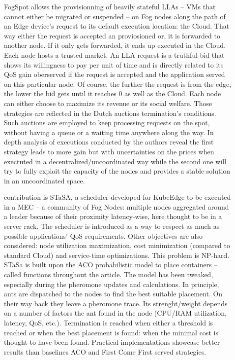 \documentclass[11pt]{sdm}
\begin{document}
\begin{description}
	\item[] FogSpot allows the provisionning of heavily stateful \glspl{LLA} -- \glspl{VM} that cannot either be migrated or suspended -- on Fog nodes along the path of an Edge device's request to its default execution location: the Cloud. That way either the request is accepted an proviosioned or, it is forwarded to another node. If it only gets forwarded, it ends up executed in the Cloud. 
	Each node hosts a trusted market. An \gls{LLA} request is a truthful bid that shows its willingness to pay per unit of time and is directly related to its \gls{QoS} gain oberserved if the request is accepted and the application served on this particular node. Of course, the further the request is from the edge, the lower the bid gets until it reaches 0 as well as the Cloud.
	Each node can either choose to maximize its revenue or its social welfare. Those strategies are reflected in the Dutch auctions termination's conditions. Such auctions are employed to keep processing requests on the spot, without having a queue or a waiting time anywhere along the way. In depth analysis of executions conducted by the authors reveal the first strategy leads to more gain but with uncertainties on the prices when exectuted in a decentralized/uncoordinated way while the second one will try to fully exploit the capacity of the nodes and provides a stable solution in an uncoordinated space.
	
	\item[] contribution is STaSA, a scheduler developed for KubeEdge to be executed in a \gls{MEC} -- a community of Fog Nodes: multiple nodes aggregated around a leader because of their proximity latency-wise, here thought to be in a server rack. The scheduler is introduced as a way to respect as much as possible applications' \gls{QoS} requirements. Other objectives are also considered: node utilization maximization, cost minimization (compared to standard Cloud) and service-time optimizations. This problem is NP-hard. STaSa is built upon the \gls{ACO} probabilistic model to place containers -- called functions throughout the article. The model has been tweaked, especially during the pheromone updates and calculations. In principle, ants are dispatched to the nodes to find the best suitable placement. On their way back they leave a pheromone trace. Its strenght/weight depends on a number of factors the ant found in the node (CPU/RAM utilization, latency, QoS, etc.). Termination is reached when either a threshold is reached or when the best placement is found: when the minimal cost is thought to have been found. Practical implementations showcase better results than baselines \gls{ACO} and First Come First served strategies.
	

\end{description}
\end{document}
